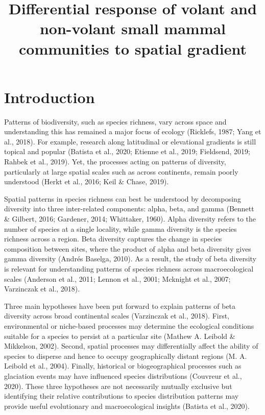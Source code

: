 \documentclass{article}
\begin{document}
\title{Differential response of volant and non-volant small mammal communities to spatial gradient}
\begin{titlepage}
\maketitle
\end{titlepage}






\section{Introduction}
Patterns of biodiversity, such as species richness, vary across space and understanding this has remained a major focus of ecology (Ricklefs, 1987; Yang et al., 2018). For example, research along latitudinal or elevational gradients is still topical and popular (Batista et al., 2020; Etienne et al., 2019; Fieldsend, 2019; Rahbek et al., 2019). Yet, the processes acting on patterns of diversity, particularly at large spatial scales such as across continents, remain poorly understood (Herkt et al., 2016; Keil \& Chase, 2019). 

\vspace{5mm}


Spatial patterns in species richness can best be understood by decomposing diversity into three inter-related components: alpha, beta, and gamma (Bennett \& Gilbert, 2016; Gardener, 2014; Whittaker, 1960). Alpha diversity refers to the number of species at a single locality, while gamma diversity is the species richness across a region. Beta diversity captures the change in species composition between sites, where the product of alpha and beta diversity gives gamma diversity (Andrés Baselga, 2010). As a result, the study of beta diversity is relevant for understanding patterns of species richness across macroecological scales (Anderson et al., 2011; Lennon et al., 2001; Mcknight et al., 2007; Varzinczak et al., 2018). 


\vspace{5mm}
Three main hypotheses have been put forward to explain patterns of beta diversity across broad continental scales (Varzinczak et al., 2018). First, environmental or niche-based processes may determine the ecological conditions suitable for a species to persist at a particular site (Mathew A. Leibold \& Mikkelson, 2002). Second, spatial processes may differentially affect the ability of species to disperse and hence to occupy geographically distant regions (M. A. Leibold et al., 2004). Finally, historical or biogeographical processes such as glaciation events may have influenced species distributions (Couvreur et al., 2020). These three hypotheses are not necessarily mutually exclusive but identifying their relative contributions to species distribution patterns may provide useful evolutionary and macroecological insights (Batista et al., 2020).
\end{document}
